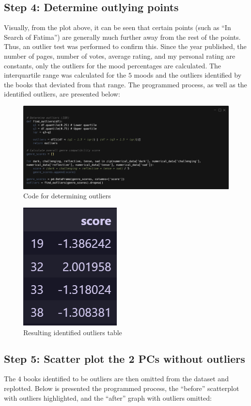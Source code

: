 \documentclass[12pt]{article}
\begin{document}
\subsection{Step 4: Determine outlying points}
Visually, from the plot above, it can be seen that certain points (such as “In Search of Fatima”) are generally much further away from the rest of the points. Thus, an outlier test was performed to confirm this. Since the year published, the number of pages, number of votes, average rating, and my personal rating are constants, only the outliers for the mood percentages are calculated. The interquartile range was calculated for the $5$ moods and the outliers identified by the books that deviated from that range. The programmed process, as well as the identified outliers, are presented below:
\begin{figure}[H]
	\includegraphics[width=\textwidth]{code3}
	\centering
	\caption{Code for determining outliers}
\end{figure}
\vspace{-1em}
\begin{figure}[H]
	\includegraphics[scale=0.4]{5}
	\centering
	\caption{Resulting identified outliers table}
\end{figure}

\subsection{Step 5: Scatter plot the 2 PCs without outliers}
The $4$ books identified to be outliers are then omitted from the dataset and replotted. Below is presented the programmed process, the “before” scatterplot with outliers highlighted, and the “after” graph with outliers omitted:
\end{document}
